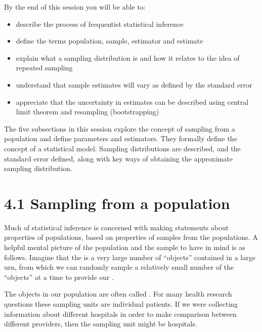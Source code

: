 \documentclass[letterpaper,10pt,english]{jupyterBook}
\begin{document}
\sphinxAtStartPar
By the end of this session you will be able to:
\begin{itemize}
\item {} 
\sphinxAtStartPar
describe the process of frequentist statistical inference

\item {} 
\sphinxAtStartPar
define the terms population, sample, estimator and estimate

\item {} 
\sphinxAtStartPar
explain what a sampling distribution is and how it relates to the idea of repeated sampling

\item {} 
\sphinxAtStartPar
understand that sample estimates will vary as defined by the standard error

\item {} 
\sphinxAtStartPar
appreciate that the uncertainty in estimates can be described using central limit theorem and resampling (bootstrapping)

\end{itemize}



\sphinxAtStartPar
The five sub\sphinxhyphen{}sections in this session explore the concept of sampling from a population and define parameters and estimators. They formally define the concept of a statistical model. Sampling distributions are described, and the standard error defined, along with key ways of obtaining the approximate sampling distribution.


\section{4.1 Sampling from a population}
\label{\detokenize{04.b. Population.and.samples:sampling-from-a-population}}\label{\detokenize{04.b. Population.and.samples::doc}}
\sphinxAtStartPar
Much of statistical inference is concerned with making statements about properties of populations, based on properties of samples from the populations. A helpful mental picture of the population and the sample to have in mind is as follows. Imagine that the  is a very large number of “objects” contained in a large urn, from which we can randomly sample a relatively small number of the “objects” at a time to provide our .

\sphinxAtStartPar
The objects in our population are often called . For many health research questions these sampling units are  individual patients. If we were collecting information about different hospitals in order to make comparison between different providers, then the sampling unit might be hospitals.
\end{document}
